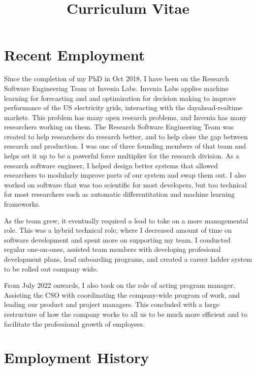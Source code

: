 \documentclass[11pt,a4paper,sans]{moderncv}
\title{Curriculum Vitae}
\begin{document}
\makecvtitle

\section{Recent Employment}
Since the completion of my PhD in Oct 2018, I have been on the Research Software Engineering Team at Invenia Labs.
Invenia Labs applies machine learning for forecasting and and optimization for decision making to improve performance of the US electricity grids, interacting with the dayahead-realtime markets.
This problem has many open research problems, and Invenia has many researchers working on them.
The Research Software Engineering Team was  created to help researchers do research better, and to help close the gap between research and production.
I was one of three founding members of that team and helps set it up to be a powerful force multiplier for the research division.
As a research software engineer, I helped design better systems that allowed researchers to modularly improve parts of our system and swap them out.
I also worked on software that was too scientific for most developers, but too technical for most researchers such as automatic differentitation and machine learning frameworks.

As the team grew, it eventually required a lead to take on a more managemental role.
This was a hybrid technical role, where I decreased amount of time on software development and spent more on supporting my team.
I conducted regular one-on-ones, assisted team members with developing profesional development plans, lead onboarding programs, and created a career ladder system to be rolled out company wide.

From July 2022 onwards, I also took on the role of acting program manager.
Assisting the CSO with coordinating the company-wide program of work, and leading our product and project managers.
This concluded with a large restructure of how the company works to all us to be much more efficient and to facilitate the professional growth of employees.

\section{Employment History}
\end{document}
